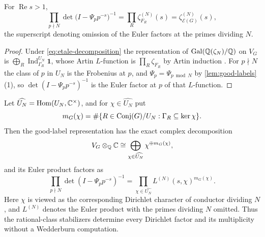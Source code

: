 \begin{corollary}
\label{cor:good-euler-product}
For \(\operatorname{Re}s>1\),
\begin{equation}
 \prod_{p\nmid N}\det\bigl(I-\Psi_pp^{-s}\bigr)^{-1}
 =\prod_R\zeta^{(N)}_{F_R}(s)
 =\zeta^{(N)}_{\mathcal E(G)}(s),
 \label{eq:good-euler-product}
\end{equation}
the superscript denoting omission of the Euler factors at the primes dividing
\(N\).
\end{corollary}

\begin{proof}
Under \eqref{eq:etale-decomposition} the representation of
\(\operatorname{Gal}(\mathbb Q(\zeta_N)/\mathbb Q)\) on \(V_G\) is
\(\bigoplus_R\operatorname{Ind}_{\Gamma_R}^{U_N}\mathbf 1\), whose Artin
\(L\)-function is \(\prod_R\zeta_{F_R}\) by Artin induction
\cite[\S{}VII]{Washington}.  For \(p\nmid N\) the class of \(p\) in \(U_N\) is
the Frobenius at \(p\), and \(\Psi_p=\Psi_{p\bmod N}\) by
\cref{lem:good-labels}(1), so \(\det(I-\Psi_pp^{-s})^{-1}\) is the Euler
factor at \(p\) of that \(L\)-function.
\end{proof}

\begin{theorem}
\label{thm:dirichlet-factorization}
Let \(\widehat{U_N}=\operatorname{Hom}(U_N,\mathbb C^\times)\), and for
\(\chi\in\widehat{U_N}\) put
\begin{equation}
  m_G(\chi) = \#\{R\in\operatorname{Conj}(G)/U_N:\Gamma_R\subseteq\ker\chi\}.
  \label{eq:dirichlet-multiplicity}
\end{equation}
Then the good-label representation has the exact complex decomposition
\begin{equation}
 V_G\otimes_\mathbb Q\mathbb C
 \cong
 \bigoplus_{\chi\in\widehat{U_N}}\chi^{\oplus m_G(\chi)},
 \label{eq:dirichlet-character-decomposition}
\end{equation}
and its Euler product factors as
\begin{equation}
 \prod_{p\nmid N}\det(I-\Psi_pp^{-s})^{-1}
 =
 \prod_{\chi\in\widehat{U_N}}
 L^{(N)}(s,\chi)^{m_G(\chi)}.
 \label{eq:dirichlet-factorization}
\end{equation}
Here \(\chi\) is viewed as the corresponding Dirichlet character of
conductor dividing \(N\), and \(L^{(N)}\) denotes the Euler product with
the primes dividing \(N\) omitted.  Thus the rational-class stabilizers
determine every Dirichlet factor and its multiplicity without a
Wedderburn computation.
\end{theorem}

